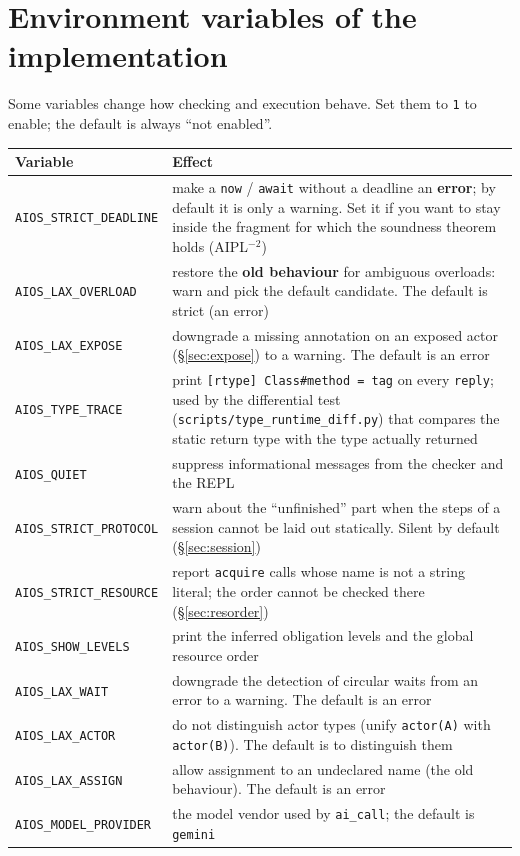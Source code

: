 \documentclass[11pt,a4paper]{article}
\begin{document}
\section{Environment variables of the implementation}
\label{sec:envvars}

Some variables change how checking and execution behave. Set them to
\texttt{1} to enable; the default is always ``not enabled''.

\begin{center}
\small
\begin{tabular}{@{}lp{9.4cm}@{}}
\toprule
Variable & Effect \\
\midrule
\texttt{AIOS\_STRICT\_DEADLINE} &
  make a \texttt{now} / \texttt{await} without a deadline an \textbf{error};
  by default it is only a warning. Set it if you want to stay inside the
  fragment for which the soundness theorem holds (AIPL$^{-2}$) \\
\texttt{AIOS\_LAX\_OVERLOAD} &
  restore the \textbf{old behaviour} for ambiguous overloads: warn and pick the
  default candidate. The default is strict (an error) \\
\texttt{AIOS\_LAX\_EXPOSE} &
  downgrade a missing annotation on an exposed actor (\S\ref{sec:expose}) to a
  warning. The default is an error \\
\texttt{AIOS\_TYPE\_TRACE} &
  print \texttt{[rtype] Class\#method = tag} on every \texttt{reply}; used by
  the differential test (\texttt{scripts/type\_runtime\_diff.py}) that compares
  the static return type with the type actually returned \\
\texttt{AIOS\_QUIET} &
  suppress informational messages from the checker and the REPL \\
\texttt{AIOS\_STRICT\_PROTOCOL} &
  warn about the ``unfinished'' part when the steps of a session cannot be laid
  out statically. Silent by default (\S\ref{sec:session}) \\
\texttt{AIOS\_STRICT\_RESOURCE} &
  report \texttt{acquire} calls whose name is not a string literal; the order
  cannot be checked there (\S\ref{sec:resorder}) \\
\texttt{AIOS\_SHOW\_LEVELS} &
  print the inferred obligation levels and the global resource order \\
\texttt{AIOS\_LAX\_WAIT} &
  downgrade the detection of circular waits from an error to a warning.
  The default is an error \\
\texttt{AIOS\_LAX\_ACTOR} &
  do not distinguish actor types (unify \texttt{actor(A)} with
  \texttt{actor(B)}). The default is to distinguish them \\
\texttt{AIOS\_LAX\_ASSIGN} &
  allow assignment to an undeclared name (the old behaviour).
  The default is an error \\
\texttt{AIOS\_MODEL\_PROVIDER} &
  the model vendor used by \texttt{ai\_call}; the default is \texttt{gemini} \\
\bottomrule
\end{tabular}
\end{center}
\end{document}
